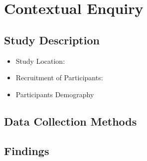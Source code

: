 
\chapter{Contextual Enquiry} %

\label{contextualenqchapter} %


\section{Study Description}
\begin{itemize}
\item{Study Location}:
\item{Recruitment of Participants}:
\item{Participants Demography}
\end{itemize}
\section{Data Collection Methods}
\section{Findings}
 
\begin{flushright}
\end{flushright}
